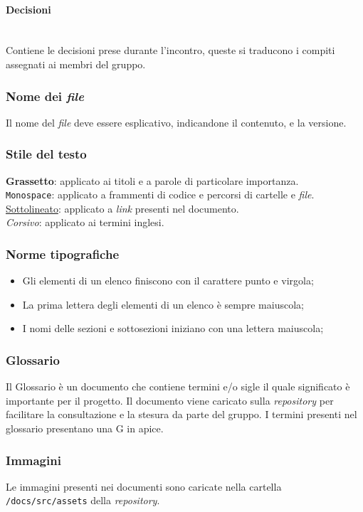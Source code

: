 \documentclass[5pt]{article}
\begin{document}
\paragraph{Decisioni}~\\
Contiene le decisioni prese durante l'incontro, queste si traducono i compiti assegnati ai membri del gruppo.

\subsubsection{Nome dei \textit{file}}
Il nome del \textit{file} deve essere esplicativo, indicandone il contenuto, e la versione.

\subsubsection{Stile del testo}
\textbf{Grassetto}: applicato ai titoli e a parole di particolare importanza. \\
\texttt{Monospace}: applicato a frammenti di codice e percorsi di cartelle e \textit{file}. \\
\underline{Sottolineato}: applicato a \textit{link} presenti nel documento.\\
\textit{Corsivo}: applicato ai termini inglesi.

\subsubsection{Norme tipografiche}
\begin{itemize}
    \item Gli elementi di un elenco finiscono con il carattere punto e virgola;
    \item La prima lettera degli elementi di un elenco è sempre maiuscola;
    \item I nomi delle sezioni e sottosezioni iniziano con una lettera maiuscola;
\end{itemize}

\subsubsection{Glossario}
Il Glossario è un documento che contiene termini e/o sigle il quale significato è importante per il progetto. Il documento viene caricato sulla \textit{repository} per facilitare la consultazione e la stesura da parte del gruppo. I termini presenti nel glossario presentano una G in apice.


\subsubsection{Immagini}
Le immagini presenti nei documenti sono caricate nella cartella \texttt{/docs/src/assets} della \textit{repository}.
\end{document}
